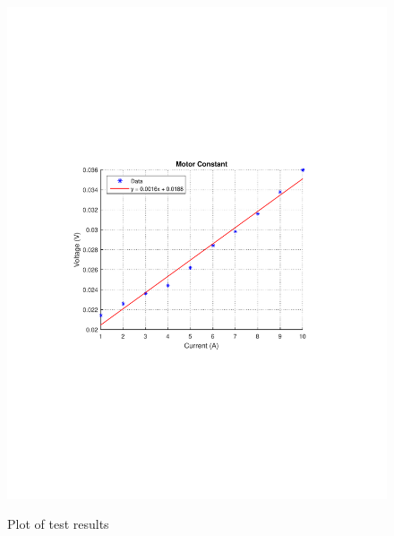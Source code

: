 \begin{figure}[H]
  \centering
  {
    \includegraphics[width=\textwidth]{figures/motorConstant.pdf}
  }
	\caption{Plot of test results}
\end{figure}
